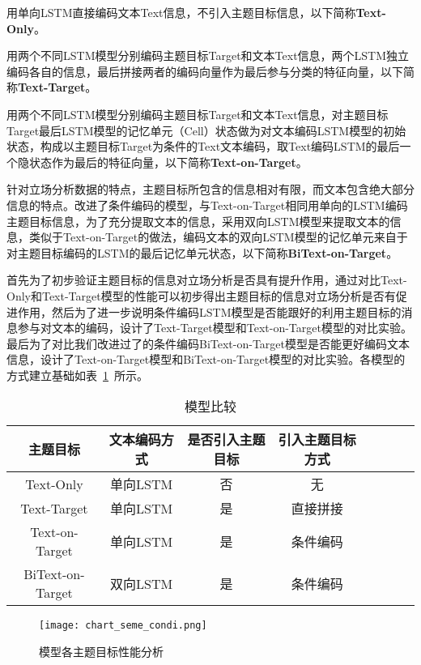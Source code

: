 用单向LSTM直接编码文本Text信息，不引入主题目标信息，以下简称\textbf{Text-Only}。


用两个不同LSTM模型分别编码主题目标Target和文本Text信息，两个LSTM独立编码各自的信息，最后拼接两者的编码向量作为最后参与分类的特征向量，以下简称\textbf{Text-Target}。

用两个不同LSTM模型分别编码主题目标Target和文本Text信息，对主题目标Target最后LSTM模型的记忆单元（Cell）状态做为对文本编码LSTM模型的初始状态，构成以主题目标Target为条件的Text文本编码，取Text编码LSTM的最后一个隐状态作为最后的特征向量，以下简称\textbf{Text-on-Target}。

针对立场分析数据的特点，主题目标所包含的信息相对有限，而文本包含绝大部分信息的特点。改进了条件编码的模型，与Text-on-Target相同用单向的LSTM编码主题目标信息，为了充分提取文本的信息，采用双向LSTM模型来提取文本的信息，类似于Text-on-Target的做法，编码文本的双向LSTM模型的记忆单元来自于对主题目标编码的LSTM的最后记忆单元状态，以下简称\textbf{BiText-on-Target}。

首先为了初步验证主题目标的信息对立场分析是否具有提升作用，通过对比Text-Only和Text-Target模型的性能可以初步得出主题目标的信息对立场分析是否有促进作用，然后为了进一步说明条件编码LSTM模型是否能跟好的利用主题目标的消息参与对文本的编码，设计了Text-Target模型和Text-on-Target模型的对比实验。最后为了对比我们改进过了的条件编码BiText-on-Target模型是否能更好编码文本信息，设计了Text-on-Target模型和BiText-on-Target模型的对比实验。各模型的方式建立基础如表~\ref{model_list}~所示。
\begin{table}[htbp]
	\caption[table123]{模型比较}
	\label{model_list}
	\vspace{0.5em}\centering\wuhao
	\begin{tabular}{cccccccc}
		\toprule[1.5pt]
		主题目标&文本编码方式&是否引入主题目标&引入主题目标方式 \\
		\midrule[1pt]
		Text-Only&单向LSTM&否&无\\
		Text-Target&单向LSTM&是&直接拼接\\
		Text-on-Target&单向LSTM&是&条件编码\\
		BiText-on-Target&双向LSTM&是&条件编码\\
		\bottomrule[1.5pt]
	\end{tabular}
\end{table}

\begin{figure}[htbp]
	\centering
	\texttt{[image: chart\_seme\_condi.png]}
	\caption[rnn_vanish]{模型各主题目标性能分析}
	\label{semeval_model_char}
\end{figure}


